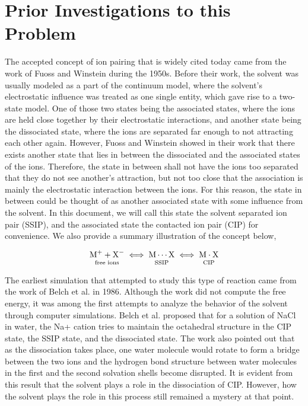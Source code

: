 \section{Prior Investigations to this Problem}
\label{sec:L12L22}

\begin{spacing}{2.0}

    The accepted concept of ion pairing that is widely cited today came from the work of Fuoss \cite{P-JACS-1954-v76-Sadek} and Winstein 
    \cite{P-JACS-1956-v78-Winstein} during the 1950s. Before their work, the solvent was usually modeled as a part of the continuum model, where 
    the solvent's electrostatic influence was treated as one single entity, which gave rise to a two-state model. One of those two states being 
    the associated states, where the ions are held close together by their electrostatic interactions, and another state being the dissociated 
    state, where the ions are separated far enough to not attracting each other again. However, Fuoss and Winstein showed in their work that 
    there exists another state that lies in between the dissociated and the associated states of the ions. Therefore, the state in between shall 
    not have the ions too separated that they do not see another's attraction, but not too close that the association is mainly the electrostatic 
    interaction between the ions. For this reason, the state in between could be thought of as another associated state with some influence from 
    the solvent. In this document, we will call this state the solvent separated ion pair (SSIP), and the associated state the contacted ion pair 
    (CIP) for convenience. We also provide a summary illustration of the concept below,

    \begin{equation}
        \underset{\text{free ions}}{\mathrm{M}^+ + \mathrm{X}^-\vphantom{p}} \iff
        \underset{\text{SSIP}}{\mathrm{M} \cdots \mathrm{X}\vphantom{p}} \iff
        \underset{\text{CIP}}{\mathrm{M} \cdot \mathrm{X}\vphantom{p}}
        \label{eq:c1s1-ionpairillus}
    \end{equation} 

    The earliest simulation that attempted to study this type of reaction came from the work of Belch et al. in 1986. \cite{P-JACS-1986-v108-Belch} 
    Although the work did not compute the free energy, it was among the first attempts to analyze the behavior of the solvent through computer 
    simulations. Belch et al. proposed that for a solution of NaCl in water, the Na+ cation tries to maintain the octahedral structure in the CIP 
    state, the SSIP state, and the dissociated state. The work also pointed out that as the dissociation takes place, one water molecule would 
    rotate to form a bridge between the two ions and the hydrogen bond structure between water molecules in the first and the second solvation 
    shells become disrupted. It is evident from this result that the solvent plays a role in the dissociation of CIP. However, how the solvent 
    plays the role in this process still remained a mystery at that point.


\end{spacing}

